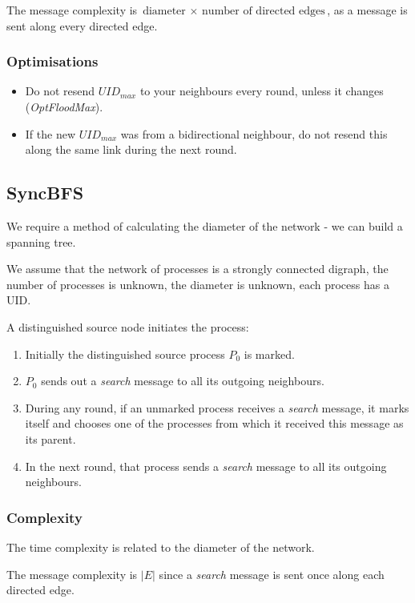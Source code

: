 \documentclass[11pt]{article}
\begin{document}
The message complexity is $\text{diameter } \times \text{ number of directed edges}$, as a message is sent along every directed edge.

\subsubsection{Optimisations}
\begin{itemize}
  \item Do not resend $UID_{max}$ to your neighbours every round, unless it changes (\textit{OptFloodMax}).
  \item If the new $UID_{max}$ was from a bidirectional neighbour, do not resend this along the same link during the next round.
\end{itemize}

\subsection{SyncBFS}
We require a method of calculating the diameter of the network -  we can build a spanning tree.

We assume that the network of processes is a strongly connected digraph, the number of processes is unknown, the diameter is unknown, each process has a UID.

A distinguished source node initiates the process:
\begin{enumerate}
  \item Initially the distinguished source process $P_0$ is marked.
  \item $P_0$ sends out a \textit{search} message to all its outgoing neighbours.
  \item During any round, if an unmarked process receives a \textit{search} message, it marks itself and chooses one of the processes from which it received this message as its parent.
  \item In the next round, that process sends a \textit{search} message to all its outgoing neighbours.
\end{enumerate}

\subsubsection{Complexity}
The time complexity is related to the diameter of the network.

The message complexity is $\lvert E \rvert$ since a \textit{search} message is sent once along each directed edge.
\end{document}
